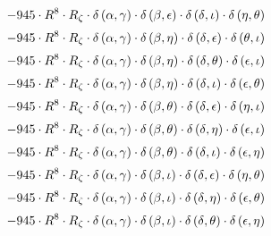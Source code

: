 \begin{subequations}
\begin{gather}
 \\[0.2em] \notag 		 - 945 \cdot R^{8} \cdot R_{\zeta{}} \cdot \delta{}\left(\alpha{}, \gamma{}\right) \cdot \delta{}\left(\beta{}, \epsilon{}\right) \cdot \delta{}\left(\delta{}, \iota{}\right) \cdot \delta{}\left(\eta{}, \theta{}\right) 
 \\[0.2em] \notag 		 - 945 \cdot R^{8} \cdot R_{\zeta{}} \cdot \delta{}\left(\alpha{}, \gamma{}\right) \cdot \delta{}\left(\beta{}, \eta{}\right) \cdot \delta{}\left(\delta{}, \epsilon{}\right) \cdot \delta{}\left(\theta{}, \iota{}\right) 
 \\[0.2em] \notag 		 - 945 \cdot R^{8} \cdot R_{\zeta{}} \cdot \delta{}\left(\alpha{}, \gamma{}\right) \cdot \delta{}\left(\beta{}, \eta{}\right) \cdot \delta{}\left(\delta{}, \theta{}\right) \cdot \delta{}\left(\epsilon{}, \iota{}\right) 
 \\[0.2em] \notag 		 - 945 \cdot R^{8} \cdot R_{\zeta{}} \cdot \delta{}\left(\alpha{}, \gamma{}\right) \cdot \delta{}\left(\beta{}, \eta{}\right) \cdot \delta{}\left(\delta{}, \iota{}\right) \cdot \delta{}\left(\epsilon{}, \theta{}\right) 
 \\[0.2em] \notag 		 - 945 \cdot R^{8} \cdot R_{\zeta{}} \cdot \delta{}\left(\alpha{}, \gamma{}\right) \cdot \delta{}\left(\beta{}, \theta{}\right) \cdot \delta{}\left(\delta{}, \epsilon{}\right) \cdot \delta{}\left(\eta{}, \iota{}\right) 
 \\[0.2em] \notag 		 - 945 \cdot R^{8} \cdot R_{\zeta{}} \cdot \delta{}\left(\alpha{}, \gamma{}\right) \cdot \delta{}\left(\beta{}, \theta{}\right) \cdot \delta{}\left(\delta{}, \eta{}\right) \cdot \delta{}\left(\epsilon{}, \iota{}\right) 
 \\[0.2em] \notag 		 - 945 \cdot R^{8} \cdot R_{\zeta{}} \cdot \delta{}\left(\alpha{}, \gamma{}\right) \cdot \delta{}\left(\beta{}, \theta{}\right) \cdot \delta{}\left(\delta{}, \iota{}\right) \cdot \delta{}\left(\epsilon{}, \eta{}\right) 
 \\[0.2em] \notag 		 - 945 \cdot R^{8} \cdot R_{\zeta{}} \cdot \delta{}\left(\alpha{}, \gamma{}\right) \cdot \delta{}\left(\beta{}, \iota{}\right) \cdot \delta{}\left(\delta{}, \epsilon{}\right) \cdot \delta{}\left(\eta{}, \theta{}\right) 
 \\[0.2em] \notag 		 - 945 \cdot R^{8} \cdot R_{\zeta{}} \cdot \delta{}\left(\alpha{}, \gamma{}\right) \cdot \delta{}\left(\beta{}, \iota{}\right) \cdot \delta{}\left(\delta{}, \eta{}\right) \cdot \delta{}\left(\epsilon{}, \theta{}\right) 
 \\[0.2em] \notag 		 - 945 \cdot R^{8} \cdot R_{\zeta{}} \cdot \delta{}\left(\alpha{}, \gamma{}\right) \cdot \delta{}\left(\beta{}, \iota{}\right) \cdot \delta{}\left(\delta{}, \theta{}\right) \cdot \delta{}\left(\epsilon{}, \eta{}\right) 

\end{gather}
\end{subequations}
